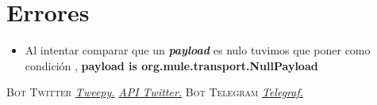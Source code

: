 \documentclass[12pt]{article}
\begin{document}
\section{Errores}
\begin{itemize}
	\item  Al intentar comparar que un \textbf{\textit{payload}} 
	      es nulo tuvimos que poner como condición ,
	      \textbf{payload is org.mule.transport.NullPayload}
\end{itemize} 

\newpage
\begin{thebibliography}{X}
	\textsc{Bot Twitter}
	\href{http://docs.tweepy.org/en/v3.4.0/getting_started.html}{\textit{Tweepy.}}
	\href{https://developer.twitter.com/en.html}{\textit{API Twitter.}}
	\textsc{Bot Telegram}
	\href{https://telegraf.js.org/#/}{\textit{Telegraf.}}
				
\end{thebibliography}
\end{document}
